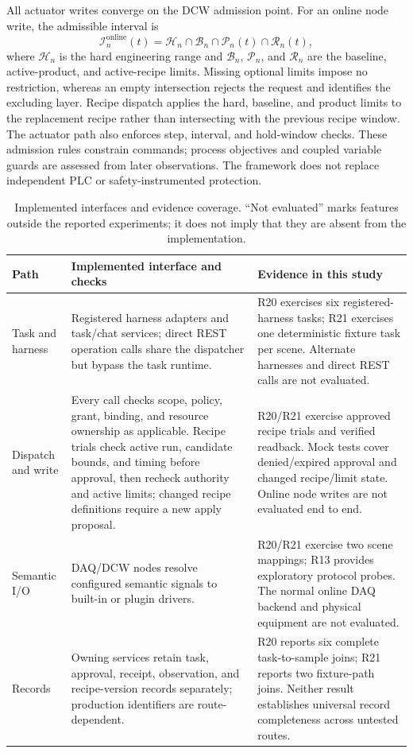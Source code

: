 All actuator writes converge on the DCW admission point. For an online node
write, the admissible interval is
\begin{equation}
\mathcal{I}^{\mathrm{online}}_n(t)=\mathcal{H}_n\cap\mathcal{B}_n
\cap\mathcal{P}_n(t)\cap\mathcal{R}_n(t),
\label{eq:admission}
\end{equation}
where $\mathcal{H}_n$ is the hard engineering range and $\mathcal{B}_n$,
$\mathcal{P}_n$, and $\mathcal{R}_n$ are the baseline, active-product, and
active-recipe limits. Missing optional limits impose no restriction, whereas
an empty intersection rejects the request and identifies the excluding
layer. Recipe dispatch applies the hard, baseline, and product limits to the
replacement recipe rather than intersecting with the previous recipe window.
The actuator path also enforces step, interval, and hold-window checks.
These admission rules constrain commands; process objectives and coupled
variable guards are assessed from later observations. The framework does
not replace independent PLC or safety-instrumented protection.

\begin{table}[!t]
\centering
\caption{Implemented interfaces and evidence coverage. “Not evaluated” marks
features outside the reported experiments; it does not imply that they are
absent from the implementation.}
\label{tab:coverage}
\footnotesize
\setlength{\tabcolsep}{3pt}
\begin{tabularx}{\textwidth}{@{}p{2.0cm}X X@{}}
\toprule
Path & Implemented interface and checks & Evidence in this study \\
\midrule
Task and harness & Registered harness adapters and task/chat services; direct REST operation calls share the dispatcher but bypass the task runtime. & R20 exercises six registered-harness tasks; R21 exercises one deterministic fixture task per scene. Alternate harnesses and direct REST calls are not evaluated. \\
Dispatch and write & Every call checks scope, policy, grant, binding, and resource ownership as applicable. Recipe trials check active run, candidate bounds, and timing before approval, then recheck authority and active limits; changed recipe definitions require a new apply proposal. & R20/R21 exercise approved recipe trials and verified readback. Mock tests cover denied/expired approval and changed recipe/limit state. Online node writes are not evaluated end to end. \\
Semantic I/O & DAQ/DCW nodes resolve configured semantic signals to built-in or plugin drivers. & R20/R21 exercise two scene mappings; R13 provides exploratory protocol probes. The normal online DAQ backend and physical equipment are not evaluated. \\
Records & Owning services retain task, approval, receipt, observation, and recipe-version records separately; production identifiers are route-dependent. & R20 reports six complete task-to-sample joins; R21 reports two fixture-path joins. Neither result establishes universal record completeness across untested routes. \\
\bottomrule
\end{tabularx}
\end{table}

